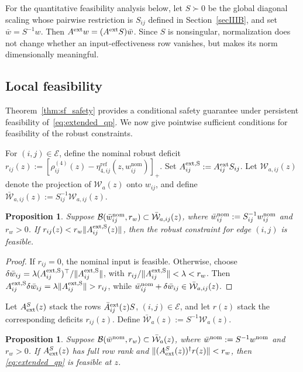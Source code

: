 \documentclass[journal,twoside,web]{ieeecolor}
\newtheorem{proposition}[theorem]{Proposition}
\begin{document}
For the quantitative feasibility analysis below, let $S\succ0$
be the global diagonal scaling whose pairwise restriction is
$S_{ij}$ defined in Section~\ref{secIIIB}, and set
$\bar w=S^{-1}w$. Then
$A^{\rm ext}w=(A^{\rm ext}S)\bar w$. Since $S$ is nonsingular,
normalization does not change whether an input-effectiveness
row vanishes, but makes its norm dimensionally meaningful.


\subsection{Local feasibility}

Theorem~\ref{thm:sf_safety} provides a conditional safety guarantee under
persistent feasibility of~\eqref{eq:extended_qp}. We now give pointwise sufficient
conditions for feasibility of the robust constraints.

For $(i,j)\in\mathcal E$, define the nominal robust
deficit $r_{ij}(z)
:=
\left[
\rho_{ij}^{(4)}(z)
-
\eta_{4,ij}^{\mathrm{ref}}(z,w_{ij}^{\mathrm{nom}})
\right]_{+}$. Set $A_{ij}^{\rm ext,S}:=A_{ij}^{\rm ext}S_{ij}$. Let $\mathcal W_{a,ij}(z)$ denote the projection of
$\mathcal W_a(z)$ onto $w_{ij}$, and define
$\bar{\mathcal W}_{a,ij}(z):=
S_{ij}^{-1}\mathcal W_{a,ij}(z)$.

\begin{proposition}
\label{prop:single_edge_feasibility}
Suppose
$\mathcal B(\bar w^{\rm nom}_{ij},r_w)\subset
\bar{\mathcal W}_{a,ij}(z)$, where
$\bar w^{\rm nom}_{ij}:=S_{ij}^{-1}w^{\rm nom}_{ij}$
and $r_w>0$. If
$r_{ij}(z)<r_w\|A_{ij}^{\rm ext,S}(z)\|$, then the robust
constraint for edge $(i,j)$ is feasible.
\end{proposition}

\begin{proof}
If $r_{ij}=0$, the nominal input is feasible. Otherwise,
choose
$\delta\bar w_{ij}
=\lambda(A_{ij}^{\rm ext,S})^\top/\|A_{ij}^{\rm ext,S}\|$,
with
$r_{ij}/\|A_{ij}^{\rm ext,S}\|<\lambda<r_w$.
Then
$A_{ij}^{\rm ext,S}\delta\bar w_{ij}
=\lambda\|A_{ij}^{\rm ext,S}\|>r_{ij}$,
while $\bar w^{\rm nom}_{ij}+\delta\bar w_{ij}
\in\bar{\mathcal W}_{a,ij}(z)$.
\end{proof}


Let $A_{\rm ext}^S(z)$ stack the rows
$\bar A_{ij}^{\rm ext}(z)S$, $(i,j)\in\mathcal E$, and let
$r(z)$ stack the corresponding deficits $r_{ij}(z)$. Define
$\bar{\mathcal W}_a(z):=S^{-1}\mathcal W_a(z)$.

\begin{proposition}
\label{prop:multi_edge_feasibility}
Suppose
$\mathcal B(\bar w^{\rm nom},r_w)\subset\bar{\mathcal W}_a(z)$,
where $\bar w^{\rm nom}:=S^{-1}w^{\rm nom}$ and $r_w>0$.
If $A_{\rm ext}^S(z)$ has full row rank and
$\|(A_{\rm ext}^S(z))^\dagger r(z)\|<r_w$, then \eqref{eq:extended_qp} is feasible at $z$.
\end{proposition}
\end{document}
